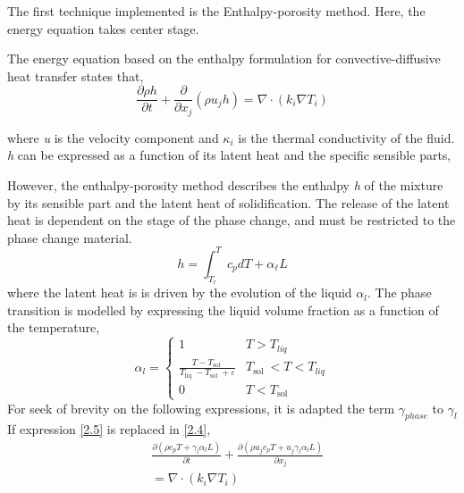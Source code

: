 \setlength{\parindent}{0.5cm} The first technique implemented is the Enthalpy-porosity method. Here, the energy equation takes center stage. 

\noindent The energy equation based on the enthalpy formulation for convective-diffusive heat transfer states that,
\begin{equation}
	\frac{\partial \rho h}{\partial t}+\frac{\partial}{\partial x_{j}}\left(\rho u_{j} h\right)=\nabla \cdot\left(k_{i} \nabla T_{i}\right)
	\label{2.3}
\end{equation}

\noindent where \textit{u} is the velocity component and $\kappa_{i}$ is the thermal conductivity of the fluid. \textit{h} can be expressed as a function of its latent heat and the specific sensible parts,

\noindent However, the enthalpy-porosity method describes the enthalpy \textit{h} of the mixture by its sensible part and the latent heat of solidification.
The release of the latent heat is dependent on the stage of the phase change, and must be restricted to the phase change material.
\begin{equation}
	h=\int_{T_{r}}^{T} c_{p} d T+\alpha_{\ell} L
	\label{2.4}
\end{equation}
where the latent heat is is driven by the evolution of the liquid $\alpha_{l}$. The phase transition is modelled by expressing the liquid volume fraction as a function of the temperature,
\begin{equation}
	\alpha_{l}= \begin{cases}
		1 & T>T_{l i q} \\ \frac{T-T_{\text {sol }}}{T_{\text {liq }}-T_{\text {sol }}+\varepsilon} & T_{\text {sol }}<T<T_{l i q} \\ 0 & T<T_{\text {sol }}
	\end{cases}
	\label{2.5}
\end{equation}
For seek of brevity on the following expressions, it is adapted the term $\gamma_{phase}$ to $\gamma_{l}$ 
If expression \ref{2.5} is replaced in \ref{2.4},
\begin{equation}
	\begin{aligned}
		&\frac{\partial\left(\rho c_{p} T + \gamma_{l} \alpha_{l} L\right)}{\partial t}+\frac{\partial\left(\rho u_{j} c_{p} T + u_{j}\gamma_{l} \alpha_{l} L\right)}{\partial x_{j}} \\
		&=\nabla \cdot\left(k_{i} \nabla T_{i}\right)
	\end{aligned}
	\label{2.6}
\end{equation}
